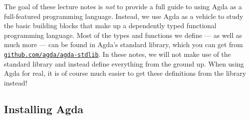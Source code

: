 \documentclass[a4paper,UKenglish]{tufte-handout}
\newcommand{\hrefu}[2]{\href{#1}{\nolinkurl{#2}}}
\theoremstyle{definition}
\begin{document}
The goal of these lecture notes is \emph{not} to provide a full guide to using
Agda as a full-featured programming language. Instead, we use Agda as a vehicle
to study the basic building blocks that make up a dependently typed functional
programming language. Most of the types and functions we define --- as well as
much more --- can be found in Agda's standard library, which you can get from
\hrefu{https://github.com/agda/agda-stdlib}{github.com/agda/agda-stdlib}. In
these notes, we will not make use of the standard library and instead define
everything from the ground up. When using Agda for real, it is of course
much easier to get these definitions from the library instead!


\subsection{Installing Agda}
\end{document}
